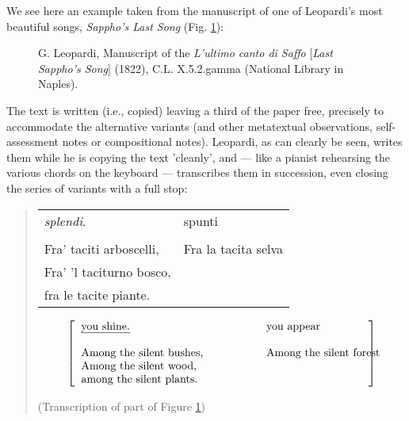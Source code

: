 \begin{paper}
We see here an example taken from the manuscript of one of Leopardi's
most beautiful songs, \emph{Sappho's Last Song} (Fig. \ref{fig:italia4}):

\begin{figure}[H]
    \centering
    \caption{G. Leopardi, Manuscript of the \emph{L'ultimo canto di Saffo}
[\emph{Last Sappho's Song}] (1822), C.L. X.5.2.gamma (National Library
in Naples).}
    \label{fig:italia4}
\end{figure}

\noindent The text is written (i.e., copied) leaving a third of the paper free,
precisely to accommodate the alternative variants (and other metatextual
observations, self-assessment notes or compositional notes). Leopardi,
as can clearly be seen, writes them while he is copying the text
'cleanly', and –– like a pianist rehearsing the various chords on the
keyboard –– transcribes them in succession, even closing the series of
variants with a full stop:

\begin{quote}

\begin{center}
\begin{tabular}{p{} p{}}
\emph{splendi}. & spunti \\
\vspace{1em} & \vspace{1em} \\
Fra' taciti arboscelli,  & Fra la tacita selva \\ 
Fra' 'l taciturno bosco, & \\
fra le tacite piante. & \\
\end{tabular}    
\end{center}

\begin{center}
\begin{equation*}
\left[\begin{tabular}{p{.45\textwidth} p{.25\textwidth}}
    \text{\emph{you shine.}} & \text{you appear} \\
    \vspace{1em} & \vspace{1em} \\
    \text{Among the silent bushes,} & \text{Among the silent forest} \\
    \text{Among the silent wood,} & \\ 
    \text{among the silent plants.} \\
\end{tabular}\right]
\end{equation*}
\end{center}
\begin{flushright}
(Transcription of part of Figure \ref{fig:italia4})
\end{flushright}
\end{quote}


\end{paper}
